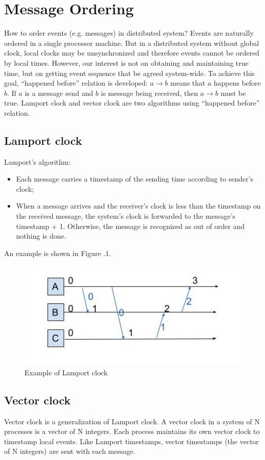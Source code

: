 \documentclass[twoside]{article}
\newcounter{lecnum}
\begin{document}
\section{Message Ordering}
How to order events (e.g. messages) in distributed system? Events are naturally
ordered in a single processor machine. But in a distributed system without
global clock, local clocks may be unsynchronized and therefore events cannot be
ordered by local times.
However, our interest is not on obtaining and maintaining true time, but on
getting event sequence that be agreed system-wide. To achieve this goal,
``happened before'' relation is developed: $a\rightarrow b$ means that $a$
happens before $b$. If $a$ is a message send and $b$ is message being received,
then $a\rightarrow b$ must be true.
Lamport clock and vector clock are two algorithms using ``happened before''
relation.
\subsection{Lamport clock}
Lamport's algorithm:
\begin{itemize}
\item Each message carries a timestamp of the sending time according to sender's
  clock;
\item When a message arrives and the receiver's clock is less than the timestamp
  on the received message, the system’s clock is forwarded to the message's
  timestamp + 1. Otherwise, the message is recognized as out of order and
  nothing is done.
\end{itemize}
An example is shown in Figure \thelecnum.1.
\begin{figure}[h]
\centering
\includegraphics[width=0.7\linewidth]{lamport}
\caption[]{Example of Lamport clock}
\label{cpl}
\end{figure}

\subsection{Vector clock}
Vector clock is a generalization of Lamport clock. A vector clock in a system of
N processes is a vector of N integers. Each process maintains its own vector
clock to timestamp local events. Like Lamport timestamps, vector timestamps (the
vector of N integers) are sent with each message.
\end{document}
